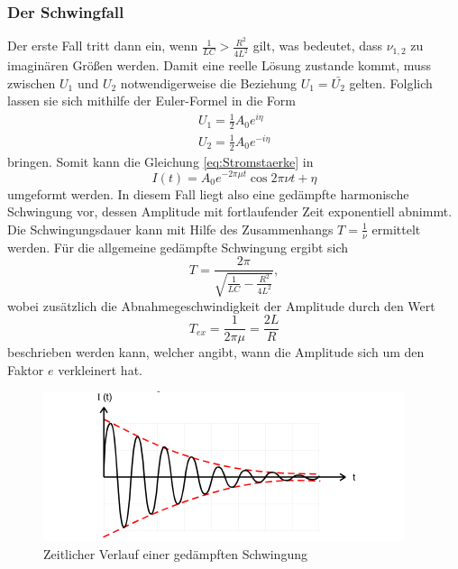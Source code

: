 \subsubsection{Der Schwingfall}
Der erste Fall tritt dann ein, wenn $\frac{1}{LC} > \frac{R^{2}}{4L^{2}}$ gilt, was bedeutet,
dass $\nu_{1,2}$ zu imaginären Größen werden. Damit eine reelle Lösung zustande kommt, muss
zwischen $U_1$ und $U_2$ notwendigerweise die Beziehung $U_1 = \bar{U_2}$ gelten. Folglich lassen 
sie sich mithilfe der Euler-Formel in die Form
\begin{align*}
    U_1 = \frac{1}{2} A_0 e^{i \eta} \\
    U_2 = \frac{1}{2} A_0 e^{-i \eta}
\end{align*}
\noindent bringen. Somit kann die Gleichung \ref{eq:Stromstaerke} in
\begin{equation}
    I(t) = A_0 e^{-2\pi \mu t} \cos{2\pi \nu t + \eta}
    \label{eq:a1}
\end{equation}
\noindent umgeformt werden. In diesem Fall liegt also eine gedämpfte harmonische Schwingung vor, 
dessen Amplitude mit fortlaufender Zeit exponentiell abnimmt. Die Schwingungsdauer kann
mit Hilfe des Zusammenhangs $T = \frac{1}{\nu}$ ermittelt werden. Für die allgemeine 
gedämpfte Schwingung ergibt sich 
\begin{equation}
    T = \frac{2\pi}{\sqrt{\frac{1}{LC}-\frac{R^{2}}{4L^{2}}}}, 
\end{equation}
\noindent wobei zusätzlich die Abnahmegeschwindigkeit der Amplitude durch den Wert 
\begin{equation}
    T_{ex} = \frac{1}{2\pi\mu} = \frac{2L}{R}
    \label{eq:a2}
\end{equation}
\noindent beschrieben werden kann, welcher angibt, wann die Amplitude sich um den Faktor $e$
verkleinert hat.

\begin{figure}[H]
  \centering
  \includegraphics{content/VerlaufGedaempfteSchwingung.png}
  \caption{Zeitlicher Verlauf einer gedämpften Schwingung}
  \label{fig:gsk}
\end{figure}


